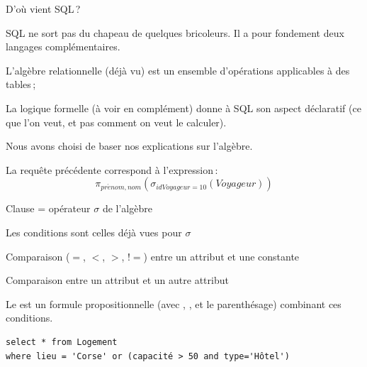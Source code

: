 \begin{frame}[fragile]{D'où vient SQL\,?}

SQL ne sort pas du chapeau de quelques bricoleurs. Il a pour fondement
deux langages complémentaires.

\vfill
\begin{redbullet}
  \item \alert{L'algèbre relationnelle} (déjà vu) est un ensemble d'opérations
     applicables à des tables\,;
    \item \alert{La logique formelle} (à voir en complément)  donne à SQL son aspect \alert{déclaratif} 
    (ce que l'on veut, et pas comment on veut le calculer).
\end{redbullet}

\vfill

Nous avons choisi de baser nos explications sur l'algèbre. 

\vfill

La requête précédente correspond à l'expression\,:
$$\pi_{pr\acute{e}nom, nom}(\sigma_{idVoyageur=10} (Voyageur))$$
 
\end{frame}


\begin{frame}[fragile]{Clause  = opérateur $\sigma$ de l'algèbre}

Les conditions sont celles déjà vues pour $\sigma$


\vfill
\begin{redbullet}
  \item Comparaison ($=$, $<$, $>$, $!=$) entre un attribut et une constante
  \item Comparaison entre un attribut et un autre attribut
\end{redbullet}

\vfill

Le  est un formule propositionnelle (avec , ,
 et le parenthésage) combinant ces conditions.


\vfill
 
\begin{verbatim}
select * from Logement 
where lieu = 'Corse' or (capacité > 50 and type='Hôtel')
\end{verbatim}

\end{frame}

